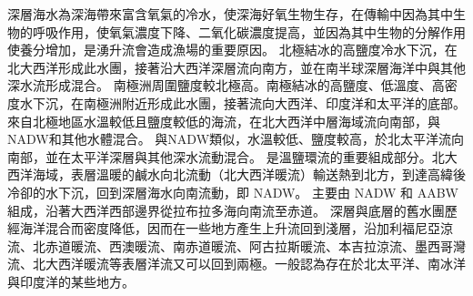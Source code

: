 \documentclass[a4paper,12pt]{report}
\begin{document}
深層海水為深海帶來富含氧氣的冷水，使深海好氧生物生存，在傳輸中因為其中生物的呼吸作用，使氧氣濃度下降、二氧化碳濃度提高，並因為其中生物的分解作用使養分增加，是湧升流會造成漁場的重要原因。
北極結冰的高鹽度冷水下沉，在北大西洋形成此水團，接著沿大西洋深層流向南方，並在南半球深層海洋中與其他深水流形成混合。
南極洲周圍鹽度較北極高。南極結冰的高鹽度、低溫度、高密度水下沉，在南極洲附近形成此水團，接著流向大西洋、印度洋和太平洋的底部。
來自北極地區水溫較低且鹽度較低的海流，在北大西洋中層海域流向南部，與NADW和其他水體混合。
與NADW類似，水溫較低、鹽度較高，於北太平洋流向南部，並在太平洋深層與其他深水流動混合。
是溫鹽環流的重要組成部分。北大西洋海域，表層溫暖的鹹水向北流動（北大西洋暖流）輸送熱到北方，到達高緯後冷卻的水下沉，回到深層海水向南流動，即 NADW。
主要由 NADW 和 AABW 組成，沿著大西洋西部邊界從拉布拉多海向南流至赤道。
深層與底層的舊水團歷經海洋混合而密度降低，因而在一些地方產生上升流回到淺層，沿加利福尼亞涼流、北赤道暖流、西澳暖流、南赤道暖流、阿古拉斯暖流、本吉拉涼流、墨西哥灣流、北大西洋暖流等表層洋流又可以回到兩極。一般認為存在於北太平洋、南冰洋與印度洋的某些地方。
\end{document}
